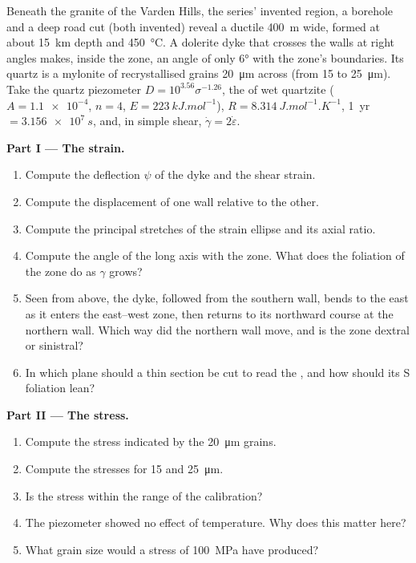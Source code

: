 \begin{problem}
\label{pb:b3:deformation-mechanisms:1}
Beneath the granite of the Varden Hills, the series' invented region, a
borehole and a deep road cut (both invented) reveal a ductile 
\qty{400}{m} wide, formed at about \qty{15}{km} depth and \qty{450}{\celsius}.
A dolerite dyke that crosses the walls at right angles makes, inside the zone,
an angle of only \ang{6} with the zone's boundaries. Its quartz is a mylonite
of recrystallised grains \qty{20}{\micro m} across (from 15 to
\qty{25}{\micro m}). Take the quartz piezometer $D = 10^{3.56}\sigma^{-1.26}$,
the  of wet quartzite ($A = \num{1.1e-4}$, $n = 4$, $E =
\qty{223}{kJ.mol^{-1}}$), $R = \qty{8.314}{J.mol^{-1}.K^{-1}}$, \qty{1}{yr} $=
\qty{3.156e7}{s}$, and, in simple shear, $\dot\gamma = 2\dot\varepsilon$.

\medskip\noindent\textbf{Part I --- The strain.}
\begin{enumerate}
  \item Compute the deflection $\psi$ of the dyke and the shear strain.
  \item Compute the displacement of one wall relative to the other.
  \item Compute the principal stretches of the strain ellipse and its axial
        ratio.
  \item Compute the angle of the long axis with the zone. What does the
        foliation of the zone do as $\gamma$ grows?
  \item Seen from above, the dyke, followed from the southern wall, bends to
        the east as it enters the east--west zone, then returns to its
        northward course at the northern wall. Which way did the northern wall
        move, and is the zone dextral or sinistral?
  \item In which plane should a thin section be cut to read the , and how should its S foliation lean?
\end{enumerate}

\medskip\noindent\textbf{Part II --- The stress.}
\begin{enumerate}[resume]
  \item Compute the stress indicated by the \qty{20}{\micro m} grains.
  \item Compute the stresses for 15 and \qty{25}{\micro m}.
  \item Is the stress within the range of the calibration?
  \item The piezometer showed no effect of temperature. Why does this matter
        here?
  \item What grain size would a stress of \qty{100}{MPa} have produced?
\end{enumerate}


\end{problem}
